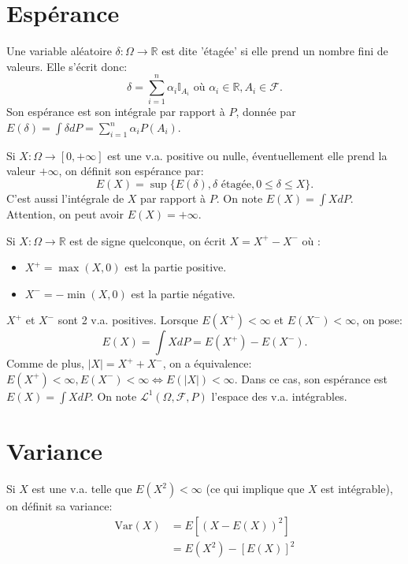 \section{Espérance}
\begin{definition}
Une variable aléatoire $\delta : \Omega \to \mathbb{R}$ est dite 'étagée' si elle prend un nombre fini de valeurs. Elle s'écrit donc:
\[ \delta = \sum_{i=1}^n \alpha_i \mathbb{I}_{A_i} \text{ où } \alpha_i \in \mathbb{R}, A_i \in \mathcal{F}. \]
Son espérance est son intégrale par rapport à $P$, donnée par $E(\delta) = \int \delta dP = \sum_{i=1}^n \alpha_i P(A_i)$.
\end{definition}
\begin{definition}
Si $X: \Omega \to [0, +\infty]$ est une v.a. positive ou nulle, éventuellement elle prend la valeur $+\infty$, on définit son espérance par:
\[ E(X) = \sup \{E(\delta), \delta \text{ étagée}, 0 \le \delta \le X\}. \]
C'est aussi l'intégrale de $X$ par rapport à $P$. On note $E(X) = \int X dP$. Attention, on peut avoir $E(X) = +\infty$.
\end{definition}
\begin{definition}
Si $X: \Omega \to \mathbb{R}$ est de signe quelconque, on écrit $X = X^+ - X^-$ où :
\begin{itemize}
    \item $X^+ = \max(X, 0)$ est la partie positive.
    \item $X^- = -\min(X, 0)$ est la partie négative.
\end{itemize}
$X^+$ et $X^-$ sont 2 v.a. positives.
Lorsque $E(X^+) < \infty$ et $E(X^-) < \infty$, on pose:
\[ E(X) = \int X dP = E(X^+) - E(X^-). \]
Comme de plus, $|X| = X^+ + X^-$, on a équivalence: $E(X^+) < \infty, E(X^-) < \infty \iff E(|X|) < \infty$.
Dans ce cas, son espérance est $E(X) = \int X dP$. On note $\mathcal{L}^1(\Omega, \mathcal{F}, P)$ l'espace des v.a. intégrables.
\end{definition}
\section{Variance}
\begin{definition}[Variance]
Si $X$ est une v.a. telle que $E(X^2) < \infty$ (ce qui implique que $X$ est intégrable), on définit sa variance:
\begin{align*}
    \text{Var}(X) &= E[(X-E(X))^2] \\
    &= E(X^2) - [E(X)]^2
\end{align*}
\end{definition}
